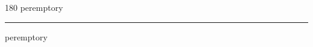
\begin{frame}
\begin{center}
\begin{turn}{180}
{\fontsize{2.5cm}{1em}\selectfont peremptory}
\end{turn}
\vspace{1em}\par  
\hrule
\vspace{1em}\par  
{\fontsize{2.5cm}{1em}\selectfont peremptory}
\end{center}
\end{frame}
